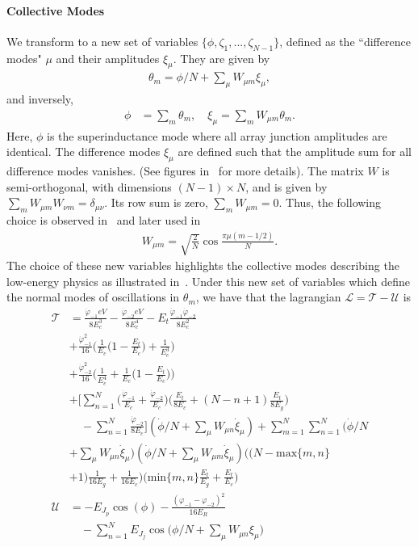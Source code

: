 \documentclass[%
reprint,
superscriptaddress,
 amsmath,amssymb,
 aps,
 prx,
longbibliography,
floatfix,
]{revtex4-2}
\begin{document}
\paragraph{Collective Modes} 
We transform to a new set of variables $\{\phi,\zeta_1,...,\zeta_{N-1}\}$, defined as the ``difference modes" $\mu$ and their amplitudes $\xi_\mu$. They are given by
\begin{align}
    \theta_m=\phi/N+\sum_\mu W_{\mu m}\xi_\mu,
\end{align}
and inversely,
\begin{align}
    \phi&=\sum_{m}\theta_m,\quad \xi_\mu=\sum_m W_{\mu m}\theta_m.
\end{align}
Here, $\phi$ is the superinductance mode where all array junction amplitudes are identical. The difference modes $\xi_\mu$ are defined such that the amplitude sum for all difference modes vanishes. (See figures in~\cite{ferguson2013symmetries} for more details). The matrix $W$ is semi-orthogonal, with dimensions $(N-1)\times N$, and is given by $\sum_m W_{\mu m}W_{\nu m}=\delta_{\mu \nu}$. Its row sum is zero, $\sum_mW_{\mu m}=0$. Thus, the following choice is observed in~\cite{ferguson2013symmetries} and later used in~\cite{viola2015collective}
\begin{align}
    W_{\mu m}=\sqrt{\frac{2}{N}}\cos{\frac{\pi\mu(m-1/2)}{N}}.
\end{align}
The choice of these new variables highlights the collective modes describing the low-energy physics as illustrated in~\cite{catelani2011relaxation,koch2009charging,manucharyan2009fluxonium}. Under this new set of variables which define the normal modes of oscillations in $\theta_m$, we have that the lagrangian $\mathcal{L} =\mathcal{T}-\mathcal{U}$ is
\begin{align}
\mathcal{T}&=\frac{\dot{\varphi}_{-1}eV}{8E_c^3}-\frac{\dot{\varphi}_{-2}eV}{8E_c^4}-E_t\frac{\dot{\varphi}_{-1}\dot{\varphi}_{-2}}{8E_c^2}\nonumber\\
    &+\frac{\dot{\varphi}^2_{-1}}{16}\Big(\frac{1}{E_c}\Big(1-\frac{E_t}{E_c}\Big)+\frac{1}{E_c^3}\Big)\\&+\frac{\dot{\varphi}^2_{-2}}{16}\Big(\frac{1}{E_c^4}+\frac{1}{E_c}\Big(1-\frac{E_t}{E_c}\Big)\Big)\nonumber\\
      &+\Big[\sum_{n=1}^N\Big(\frac{\dot{\varphi}_{-1}}{E_c}+\frac{\dot{\varphi}_{-2}}{E_c}\Big)\Big(\frac{E_t}{8E_c}+(N-n+1)\frac{E_t}{8E_g}\Big)\nonumber\\&\quad-\sum_{n=1}^N\frac{\dot{\varphi}_{-2}}{8E_c}\Big](\dot{\phi}/N+\sum_\mu W_{\mu n}\dot{\xi}_\mu)+\sum_{m=1}^N\sum_{n=1}^N(\dot{\phi}/N\nonumber\\
  &+\sum_\mu W_{\mu n}\dot{\xi}_\mu)(\dot{\phi}/N+\sum_\mu W_{\mu m}\dot{\xi}_\mu)\Big( (N-\text{max}\{m,n\}\nonumber\\&+1)\frac{1}{16E_g}+\frac{1}{16E_c}\Big)\Big(\text{min}\{m,n\}\frac{E_t}{E_g}+\frac{E_t}{E_c}\Big)\label{eq:kin-energy}\\
    \mathcal{U}&=-E_{J_p}\cos(\phi)-\frac{(\varphi_{-1}-\varphi_{-2})^2}{16E_{R}}\nonumber\\&\quad-\sum_{n=1}^NE_{J_j}\cos\Big(\phi/N+\sum_\mu W_{\mu n}\xi_\mu\Big)\label{eq:pot-energy}
\end{align}
\end{document}
